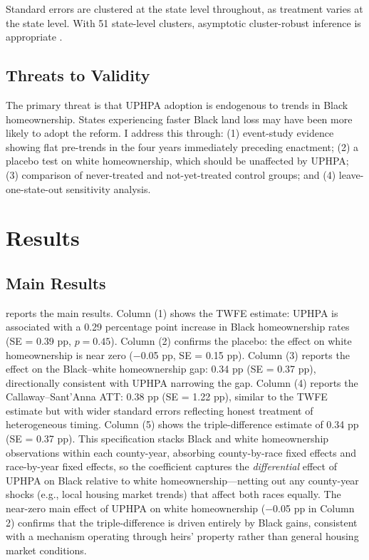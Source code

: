 \documentclass[12pt]{article}
\begin{document}
Standard errors are clustered at the state level throughout, as treatment varies at the state level. With 51 state-level clusters, asymptotic cluster-robust inference is appropriate \citep{baker2022}.

\subsection{Threats to Validity}

The primary threat is that UPHPA adoption is endogenous to trends in Black homeownership. States experiencing faster Black land loss may have been more likely to adopt the reform. I address this through: (1) event-study evidence showing flat pre-trends in the four years immediately preceding enactment; (2) a placebo test on white homeownership, which should be unaffected by UPHPA; (3) comparison of never-treated and not-yet-treated control groups; and (4) leave-one-state-out sensitivity analysis.

\section{Results}

\subsection{Main Results}



 reports the main results. Column (1) shows the TWFE estimate: UPHPA is associated with a 0.29 percentage point increase in Black homeownership rates (SE = 0.39 pp, $p = 0.45$). Column (2) confirms the placebo: the effect on white homeownership is near zero ($-$0.05 pp, SE = 0.15 pp). Column (3) reports the effect on the Black--white homeownership gap: 0.34 pp (SE = 0.37 pp), directionally consistent with UPHPA narrowing the gap. Column (4) reports the Callaway--Sant'Anna ATT: 0.38 pp (SE = 1.22 pp), similar to the TWFE estimate but with wider standard errors reflecting honest treatment of heterogeneous timing. Column (5) shows the triple-difference estimate of 0.34 pp (SE = 0.37 pp). This specification stacks Black and white homeownership observations within each county-year, absorbing county-by-race fixed effects and race-by-year fixed effects, so the coefficient captures the \textit{differential} effect of UPHPA on Black relative to white homeownership---netting out any county-year shocks (e.g., local housing market trends) that affect both races equally. The near-zero main effect of UPHPA on white homeownership ($-$0.05 pp in Column 2) confirms that the triple-difference is driven entirely by Black gains, consistent with a mechanism operating through heirs' property rather than general housing market conditions.
\end{document}
